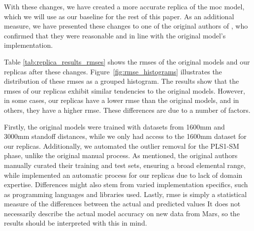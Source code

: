 With these changes, we have created a more accurate replica of the \gls{moc} model, which we will use as our baseline for the rest of this paper.
As an additional measure, we have presented these changes to one of the original authors of \citet{cleggRecalibrationMarsScience2017}, who confirmed that they were reasonable and in line with the original model's implementation.

Table \ref{tab:replica_results_rmses} shows the \gls{rmse}s of the original models and our replicas after these changes.
Figure~\ref{fig:rmse_histograms} illustrates the distribution of these \gls{rmse}s as a grouped histogram.
The results show that the \gls{rmse}s of our replicas exhibit similar tendencies to the original models.
However, in some cases, our replicas have a lower \gls{rmse} than the original models, and in others, they have a higher \gls{rmse}.
These differences are due to a number of factors.

Firstly, the original models were trained with datasets from 1600mm and 3000mm standoff distances, while we only had access to the 1600mm dataset for our replicas.
Additionally, we automated the outlier removal for the PLS1-SM phase, unlike the original manual process.
As mentioned, the original authors manually curated their training and test sets, ensuring a broad elemental range, while implemented an automatic process for our replicas due to lack of domain expertise.
Differences might also stem from varied implementation specifics, such as programming languages and libraries used.
Lastly, \gls{rmse} is simply a statistical measure of the differences between the actual and predicted values
It does not necessarily describe the actual model accuracy on new data from Mars, so the results should be interpreted with this in mind.

